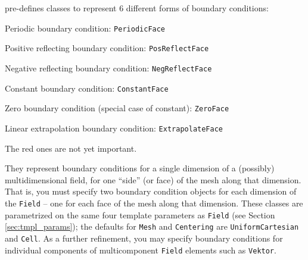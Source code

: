 \ippl pre-defines classes to represent 6 different forms of boundary conditions:
\begin{enumerate}
    \item Periodic boundary condition: \texttt{PeriodicFace}
    \item {\color{red} Positive reflecting boundary condition: \texttt{PosReflectFace}
    \item Negative reflecting boundary condition: \texttt{NegReflectFace}
    \item Constant boundary condition: \texttt{ConstantFace}}
    \item Zero boundary condition (special case of constant): \texttt{ZeroFace}
    \item {\color{red} Linear extrapolation boundary condition: \texttt{ExtrapolateFace}}
\end{enumerate}
The {\color{red} red} ones are not yet important.


They represent boundary conditions for a single dimension of a (possibly) multidimensional field, for one ``side'' (or face) of the mesh along that dimension. That is, you must specify two boundary condition objects for each dimension of the \texttt{Field} -- one for each face of the mesh along that dimension. These classes are parametrized on the same four template parameters as \texttt{Field} (see Section \ref{sec:tmpl_params}); the defaults for \texttt{Mesh} and \texttt{Centering} are
\texttt{UniformCartesian} and \texttt{Cell}. As a
further refinement, you may specify boundary conditions for individual components of multicomponent \texttt{Field} elements such as \texttt{Vektor}.

\subsection{}

